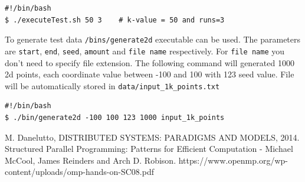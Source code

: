 \documentclass[12pt,a4paper]{report}
\begin{document}
\begin{verbatim}
#!/bin/bash
$ ./executeTest.sh 50 3    # k-value = 50 and runs=3
\end{verbatim}

To generate test data \verb|/bins/generate2d| executable can be used. The parameters are \verb|start|, \verb|end|, \verb|seed|, \verb|amount| and \verb|file name| respectively. For \verb|file name| you don't need to specify file extension. The following command will generated 1000 2d points, each coordinate value between -100 and 100 with 123 seed value. File will be automatically stored in \verb|data/input_1k_points.txt| 

\begin{verbatim}
#!/bin/bash
$ ./bin/generate2d -100 100 123 1000 input_1k_points
\end{verbatim}

\begin{thebibliography}{9}
 M. Danelutto, DISTRIBUTED SYSTEMS: PARADIGMS AND MODELS, 2014.
 Structured Parallel Programming: Patterns for Efficient Computation - Michael McCool, James Reinders and Arch D. Robison.
 https://www.openmp.org/wp-content/uploads/omp-hands-on-SC08.pdf

\end{thebibliography}
\newpage

\appendix
\end{document}
